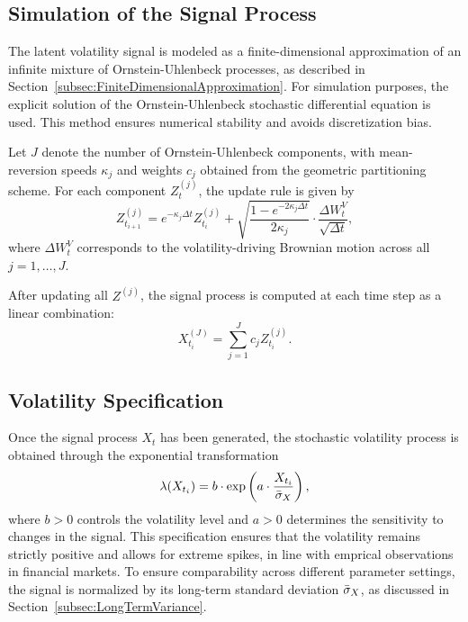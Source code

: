 \subsection{Simulation of the Signal Process} \label{subsec:SimulationSignalProcess}

The latent volatility signal is modeled as a finite-dimensional approximation of an infinite mixture of Ornstein-Uhlenbeck processes, as described in Section~\ref{subsec:FiniteDimensionalApproximation}. For simulation purposes, the explicit solution of the Ornstein-Uhlenbeck stochastic differential equation is used. This method ensures numerical stability and avoids discretization bias.

Let $J$ denote the number of Ornstein-Uhlenbeck components, with mean-reversion speeds $\kappa_j$ and weights $c_j$ obtained from the geometric partitioning scheme. For each component $Z_t^{(j)}$, the update rule is given by
\begin{equation} \label{eq:TimeDiscrOUExact}
    Z_{t_{i+1}}^{(j)} = e^{-\kappa_j \Delta t} Z_{t_i}^{(j)} + \sqrt{\frac{1 - e^{-2 \kappa_j \Delta t}}{2 \kappa_j}} \cdot \frac{\Delta W_t^V}{\sqrt{\Delta t}},
\end{equation}
where $\Delta W_t^V$ corresponds to the volatility-driving Brownian motion across all $j = 1,\ldots,J$.

After updating all $Z^{(j)}$, the signal process is computed at each time step as a linear combination:
\begin{equation} \label{eq:TimeDiscrSignal}
    X_{t_i}^{(J)} = \sum_{j=1}^J c_j Z_{t_i}^{(j)}.
\end{equation}


\subsection{Volatility Specification} \label{subsec:VolatilitySpecification}

Once the signal process $X_t$ has been generated, the stochastic volatility process is obtained through the exponential transformation
\begin{equation} \label{eq:TimeDiscrVolatility}
    \lambda(X_{t_i}) = b \cdot \exp\left( a \cdot \frac{X_{t_i}}{\Bar{\sigma}_X} \right),
\end{equation}
where $b > 0$ controls the volatility level and $a > 0$ determines the sensitivity to changes in the signal. This specification ensures that the volatility remains strictly positive and allows for extreme spikes, in line with emprical observations in financial markets. To ensure comparability across different parameter settings, the signal is normalized by its long-term standard deviation $\Bar{\sigma}_X$, as discussed in Section~\ref{subsec:LongTermVariance}.

